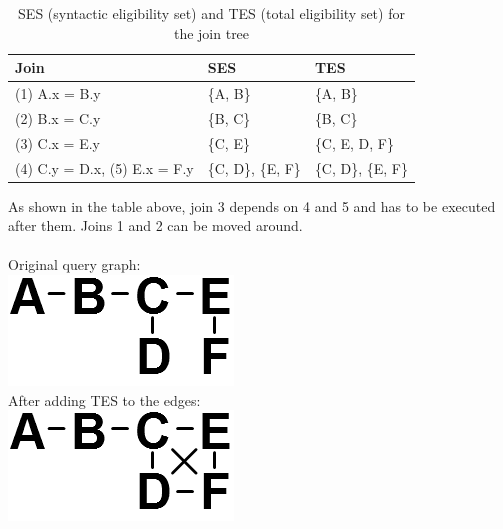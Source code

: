 \documentclass[11pt,a4paper]{scrartcl}
\begin{document}
\begin{table}[H]
\centering
\begin{tabular}{|l|l|l|}
\hline
Join & SES & TES\\
\hline
(1) A.x = B.y & \{A, B\} & \{A, B\}\\
(2) B.x = C.y & \{B, C\} & \{B, C\}\\
(3) C.x = E.y & \{C, E\} & \{C, E, D, F\}\\
(4) C.y = D.x, (5) E.x = F.y & \{C, D\}, \{E, F\} & \{C, D\}, \{E, F\}\\
\hline
\end{tabular}
\caption{SES (syntactic eligibility set) and TES (total eligibility set) for the join tree}
\label{tab:order}
\end{table}
As shown in the table above, join 3 depends on 4 and 5 and has to be executed after them. Joins 1 and 2 can be moved around.\\\\
Original query graph:\\
\includegraphics[scale=.5]{graph/qg_org}\\
After adding TES to the edges:\\
\includegraphics[scale=.5]{graph/qg_tes}\\
\end{document}
